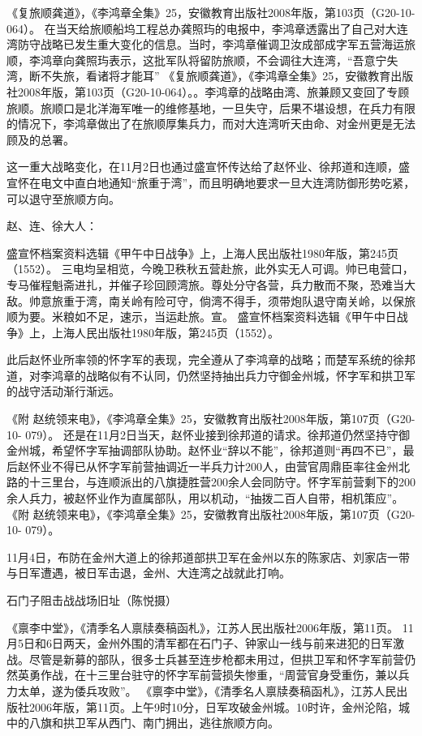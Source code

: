 \documentclass[12pt,UTF8]{ctexbook}
\begin{document}
《复旅顺龚道》，《李鸿章全集》25，安徽教育出版社2008年版，第103页（G20-10-064）。
在当天给旅顺船坞工程总办龚照玙的电报中，李鸿章透露出了自己对大连湾防守战略已发生重大变化的信息。当时，李鸿章催调卫汝成部成字军五营海运旅顺，李鸿章向龚照玙表示，这批军队将留防旅顺，不会调往大连湾，“吾意宁失湾，断不失旅，看诸将才能耳” 《复旅顺龚道》，《李鸿章全集》25，安徽教育出版社2008年版，第103页（G20-10-064）。。李鸿章的战略由湾、旅兼顾又变回了专顾旅顺。旅顺口是北洋海军唯一的维修基地，一旦失守，后果不堪设想，在兵力有限的情况下，李鸿章做出了在旅顺厚集兵力，而对大连湾听天由命、对金州更是无法顾及的总署。

这一重大战略变化，在11月2日也通过盛宣怀传达给了赵怀业、徐邦道和连顺，盛宣怀在电文中直白地通知“旅重于湾”，而且明确地要求一旦大连湾防御形势吃紧，可以退守至旅顺方向。

赵、连、徐大人：

盛宣怀档案资料选辑《甲午中日战争》上，上海人民出版社1980年版，第245页（1552）。
三电均呈相览，今晚卫秩秋五营赴旅，此外实无人可调。帅已电营口，专马催程魁斋进扎，并催子珍回顾湾旅。尊处分守各营，兵力散而不聚，恐难当大敌。帅意旅重于湾，南关岭有险可守，倘湾不得手，须带炮队退守南关岭，以保旅顺为要。米粮如不足，速示，当运赴旅。宣。 盛宣怀档案资料选辑《甲午中日战争》上，上海人民出版社1980年版，第245页（1552）。

此后赵怀业所率领的怀字军的表现，完全遵从了李鸿章的战略；而楚军系统的徐邦道，对李鸿章的战略似有不认同，仍然坚持抽出兵力守御金州城，怀字军和拱卫军的战守活动渐行渐远。

《附 赵统领来电》，《李鸿章全集》25，安徽教育出版社2008年版，第107页（G20-10- 079）。
还是在11月2日当天，赵怀业接到徐邦道的请求。徐邦道仍然坚持守御金州城，希望怀字军抽调部队协助。赵怀业“辞以不能”，徐邦道则“再四不已”，最后赵怀业不得已从怀字军前营抽调近一半兵力计200人，由营官周鼎臣率往金州北路的十三里台，与连顺派出的八旗捷胜营200余人会同防守。怀字军前营剩下的200余人兵力，被赵怀业作为直属部队，用以机动，“抽拨二百人自带，相机策应”。 《附 赵统领来电》，《李鸿章全集》25，安徽教育出版社2008年版，第107页（G20-10- 079）。

11月4日，布防在金州大道上的徐邦道部拱卫军在金州以东的陈家店、刘家店一带与日军遭遇，被日军击退，金州、大连湾之战就此打响。


石门子阻击战战场旧址（陈悦摄）

《禀李中堂》，《清季名人禀牍奏稿函札》，江苏人民出版社2006年版，第11页。
11月5日和6日两天，金州外围的清军都在石门子、钟家山一线与前来进犯的日军激战。尽管是新募的部队，很多士兵甚至连步枪都未用过，但拱卫军和怀字军前营仍然英勇作战，在十三里台驻守的怀字军前营损失惨重，“周营官身受重伤，兼以兵力太单，遂为倭兵攻败”。 《禀李中堂》，《清季名人禀牍奏稿函札》，江苏人民出版社2006年版，第11页。上午9时10分，日军攻破金州城。10时许，金州沦陷，城中的八旗和拱卫军从西门、南门拥出，逃往旅顺方向。
\end{document}
